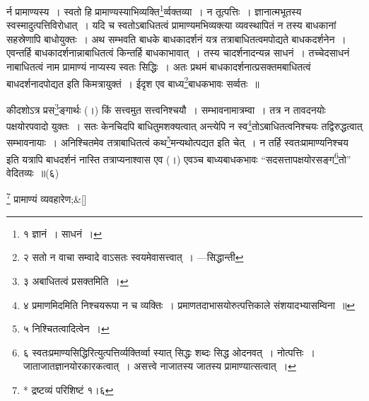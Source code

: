 \documentclass[article,12pt,a4paper]{memoir}
\begin{document}
	
	  \endgroup
	\leavevmode{}

	   र्न प्रामाण्यस्य । स्वतो हि प्रामाण्यस्याभिव्यक्ति\footnote{\label{pvv.6-1-bis}  १ ज्ञानं । साधनं ।}र्व्वक्तव्या । न तूत्पत्तिः । ज्ञानात्मभूतस्य स्वस्मादुत्पत्तिविरोधात् । यदि च स्वतोऽबाधितत्वं प्रामाण्यमभिव्यक्त्या व्यवस्थापितं न तस्य बाधकानां सहस्रेणापि बाधोयुक्तः । अथ सम्भवति बाधके बाधकादर्शनं यत्र तत्राबाधितत्वमपोद्यते बाधकदर्शनेन । एवन्तर्हि बाधकादर्शनान्नाबाधितत्वं किन्तर्हि बाधकाभावात् । तस्य चादर्शनादन्यन्न साधनं । तच्चेदसाधनं नाबाधितत्वं नाम प्रामाण्यं नाप्यस्य स्वतः सिद्धिः । अतः प्रथमं बाधकादर्शनात्प्रसक्तमबाधितत्वं बाधदर्शनादपोद्यत इति किमत्रायुक्तं । ईदृश एव बाध्य\footnote{\label{pvv.6-2}  २ सतो न वाचा सम्वादे वाऽसतः स्वयमेवासत्त्वात् । ---सिद्धान्ती}बाधकभावः सर्व्वतः ॥
	\pend
      

	  \pstart कीदशोऽत्र प्रस\footnote{\label{pvv.6-3}  ३ अबाधितत्वं प्रसक्तमिति ।}ङ्गार्थः (।) किं सत्त्वमुत सत्त्वनिश्चयौ । सम्भावनामात्रम्वा । तत्र न तावदनयोः पक्षयोरपवादो युक्तः । सतः केनचिदपि बाधितुमशक्यत्वात् अन्त्येपि न स्व\footnote{\label{pvv.6-4}  ४ प्रमाणमिदमिति निश्चयरूपा न च व्यक्तिः । प्रमाणतदाभासयोरुत्पत्तिकाले संशयादभ्यासम्विना ॥}तोऽबाधितत्वनिश्चयः तद्विरुद्धत्वात् सम्भावनायाः । अनिश्चितमेव तत्राबाधितत्वं कथ\footnote{\label{pvv.6-5}  ५ निश्चितत्वादित्वेन ।}मन्यथोत्पद्यत इति चेत् । न तर्हि स्वतःप्रामाण्यनिश्चय इति यत्रापि बाधदर्शनं नास्ति तत्राप्यनाश्वास एव (।) एवञ्च बाध्यबाधकभावः {\color{DodgerBlue3}“सदसत्तापक्षयोरसङ्ग\footnote{\label{pvv.6-6}  ६ स्वतःप्रमाण्यसिद्धिरित्युत्पत्तिर्व्यक्तिर्व्वा स्यात् सिद्धः शब्दः सिद्ध ओदनवत् । नोत्पत्तिः । जाताजातज्ञानयोरकारकत्वात् । असत्त्वे नाजातस्य जातस्य प्रामाण्यात्सत्वात् ।}तो”} वेदितव्यः ॥(६)
	\pend
      \label{div_pvv.1.7}
	  
	
	  \bigskip
	  \begingroup
	
	    \large
	  
	    
	    \stanza[\smallbreak]
	\label{pv.1.7a}\footnote{\label{pvv.6-asterisk}  * द्रष्टव्यं परिशिष्टं १।६} प्रामाण्यं व्यवहारेण;\&[\smallbreak]


	
	  \endgroup
	
\end{document}
